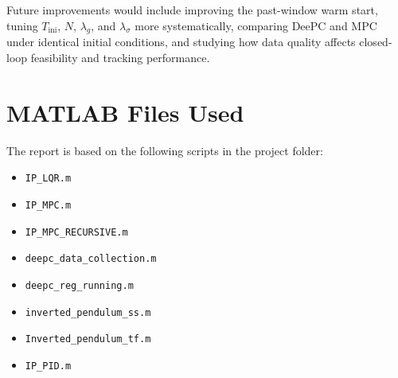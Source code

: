 \documentclass[conference]{IEEEtran}
\begin{document}
Future improvements would include improving the past-window warm start, tuning $T_{\mathrm{ini}}$, $N$, $\lambda_g$, and $\lambda_{\sigma}$ more systematically, comparing DeePC and MPC under identical initial conditions, and studying how data quality affects closed-loop feasibility and tracking performance.




\appendices
\section{MATLAB Files Used}
The report is based on the following scripts in the project folder:
\begin{itemize}
    \item \texttt{IP\_LQR.m}
    \item \texttt{IP\_MPC.m}
    \item \texttt{IP\_MPC\_RECURSIVE.m}
    \item \texttt{deepc\_data\_collection.m}
    \item \texttt{deepc\_reg\_running.m}
    \item \texttt{inverted\_pendulum\_ss.m}
    \item \texttt{Inverted\_pendulum\_tf.m}
    \item \texttt{IP\_PID.m}
\end{itemize}
\end{document}
